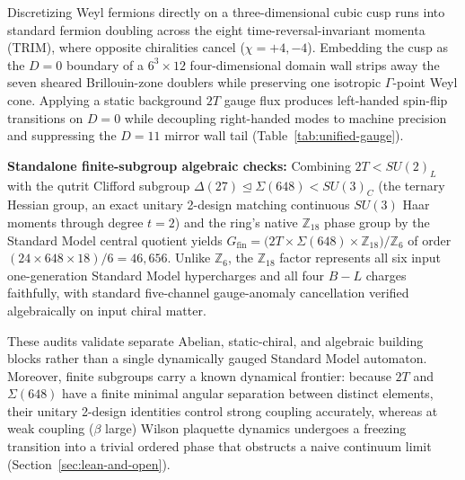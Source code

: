 Discretizing Weyl fermions directly on a three-dimensional cubic cusp runs into standard fermion doubling across the
eight time-reversal-invariant momenta (TRIM), where opposite chiralities cancel ($\chi = +4, -4$). Embedding the cusp as
the $D = 0$ boundary of a $6^3 \times 12$ four-dimensional domain wall strips away the seven sheared Brillouin-zone
doublers while preserving one isotropic $\Gamma$-point Weyl cone. Applying a static background $2T$ gauge flux produces
left-handed spin-flip transitions on $D = 0$ while decoupling right-handed modes to machine precision and suppressing
the $D = 11$ mirror wall tail (Table~\ref{tab:unified-gauge}).

\textbf{Standalone finite-subgroup algebraic checks:} Combining $2T < SU(2)_L$ with the qutrit Clifford subgroup
$\Delta(27) \trianglelefteq \Sigma(648) < SU(3)_C$ (the ternary Hessian group, an exact unitary 2-design matching
continuous $SU(3)$ Haar moments through degree $t = 2$) and the ring's native $\mathbb{Z}_{18}$ phase group by the
Standard Model central quotient yields $G_{\mathrm{fin}} = \bigl(2T \times \Sigma(648) \times \mathbb{Z}_{18}\bigr)/\mathbb{Z}_6$
of order $(24 \times 648 \times 18)/6 = 46{,}656$. Unlike $\mathbb{Z}_6$, the $\mathbb{Z}_{18}$ factor represents
all six input one-generation Standard Model hypercharges and all four $B - L$ charges faithfully, with standard
five-channel gauge-anomaly cancellation verified algebraically on input chiral matter.

These audits validate separate Abelian, static-chiral, and algebraic building blocks rather than a single dynamically
gauged Standard Model automaton. Moreover, finite subgroups carry a known dynamical frontier: because $2T$ and
$\Sigma(648)$ have a finite minimal angular separation between distinct elements, their unitary 2-design identities
control strong coupling accurately, whereas at weak coupling ($\beta$ large) Wilson plaquette dynamics undergoes a
freezing transition into a trivial ordered phase that obstructs a naive continuum limit (Section~\ref{sec:lean-and-open}).

